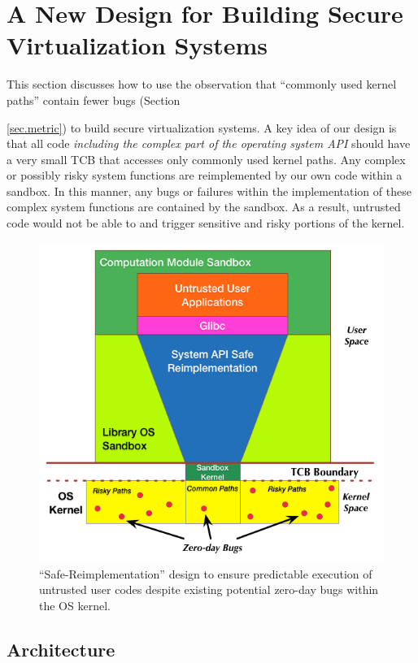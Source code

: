 \section{A New Design for Building Secure Virtualization Systems}
\label{sec.design}

This section discusses how to use the observation
 that ``commonly used kernel paths'' contain fewer bugs
(Section {\ref{sec.metric}) to build secure virtualization systems.
A key idea of our design is that all code \emph{including the complex part
of the operating system API} should have a very small TCB that accesses only
commonly used kernel paths.
Any complex or possibly risky system functions
are reimplemented by our own code within a sandbox. In this manner, any bugs
or failures within the implementation of these complex system functions
are contained by the sandbox. As a result, untrusted code would not be able to
and trigger sensitive and risky portions of the kernel.


\begin{figure}%
\centering
\includegraphics[width=1.0\columnwidth]{diagram/lind_secure_design_new.png}
\caption{``Safe-Reimplementation'' design to ensure predictable execution of untrusted user codes despite existing potential zero-day bugs within the OS kernel.}
\label{fig:design}
\end{figure}

\subsection{Architecture}

}
